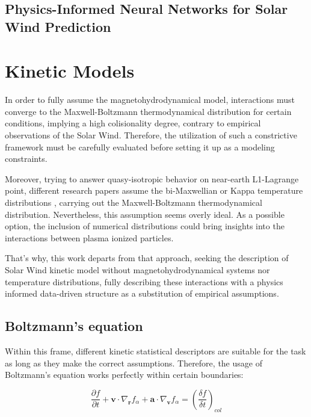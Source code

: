 \documentclass[12pt]{article}
\begin{document}
\subsection{Physics-Informed Neural Networks for Solar Wind Prediction}

\cite{johnson2022physics}

\section{Kinetic Models}
In order to fully assume the magnetohydrodynamical model, interactions must converge to the Maxwell-Boltzmann thermodynamical distribution for certain conditions, implying a high colisionality degree, contrary to empirical observations of the Solar Wind. Therefore, the utilization of such a constrictive framework must be carefully evaluated before setting it up as a modeling constraints.

Moreover, trying to answer quasy-isotropic behavior on near-earth L1-Lagrange point, different research papers assume the bi-Maxwellian or Kappa temperature distributions \cite{Stansby_2018, Nicolaou_2018, Zouganelis_2004}, carrying out the Maxwell-Boltzmann thermodynamical distribution. Nevertheless, this assumption seems overly ideal. As a possible option, the inclusion of numerical distributions could bring insights into the interactions between plasma ionized particles.

That's why, this work departs from that approach, seeking the description of Solar Wind kinetic model without magnetohydrodynamical systems nor temperature distributions, fully describing these interactions with a physics informed data-driven structure as a substitution of empirical assumptions.

\subsection{Boltzmann's equation}
Within this frame, different kinetic statistical descriptors are suitable for the task as long as they make the correct assumptions. Therefore, the usage of Boltzmann's equation works perfectly within certain boundaries:

\begin{equation}
    \frac{\partial f}{\partial t} + \mathbf{v} \cdot \nabla_{\mathbf{r}} f_\alpha + \mathbf{a} \cdot \nabla_{\mathbf{v}} f_\alpha= \left(\frac{\delta f}{\delta t}\right)_{col}
\end{equation}
\end{document}
